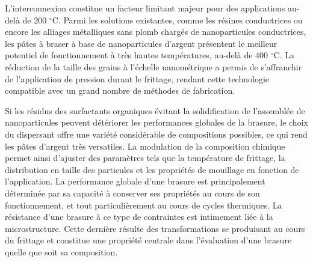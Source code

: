 L'interconnexion constitue un facteur limitant majeur pour des applications au-delà de 200 $^\circ$C. Parmi les solutions existantes, comme les résines conductrices ou encore les alliages métalliques sans plomb chargés de nanoparticules conductrices, les pâtes à braser à base de nanoparticules d'argent présentent le meilleur potentiel de fonctionnement à très hautes températures, au-delà de 400 $^\circ$C. La réduction de la taille des grains à l'échelle nanométrique a permis de s'affranchir de l'application de pression durant le frittage, rendant cette technologie compatible avec un grand nombre de méthodes de fabrication.

Si les résidus des surfactants organiques évitant la solidification de l'assemblée de nanoparticules peuvent détériorer les performances globales de la brasure, le choix du dispersant offre une variété considérable de compositions possibles, ce qui rend les pâtes d'argent très versatiles. La modulation de la composition chimique permet ainsi d'ajuster des paramètres tels que la température de frittage, la distribution en taille des particules et les propriétés de mouillage en fonction de l'application. La performance globale d'une brasure est principalement déterminée par sa capacité à conserver ses propriétés au cours de son fonctionnement, et tout particulièrement au cours de cycles thermiques. La résistance d'une brasure à ce type de contraintes est intimement liée à la microstructure. Cette dernière résulte des transformations se produisant au cours du frittage et constitue une propriété centrale dans l'évaluation d'une brasure quelle que soit sa composition.

